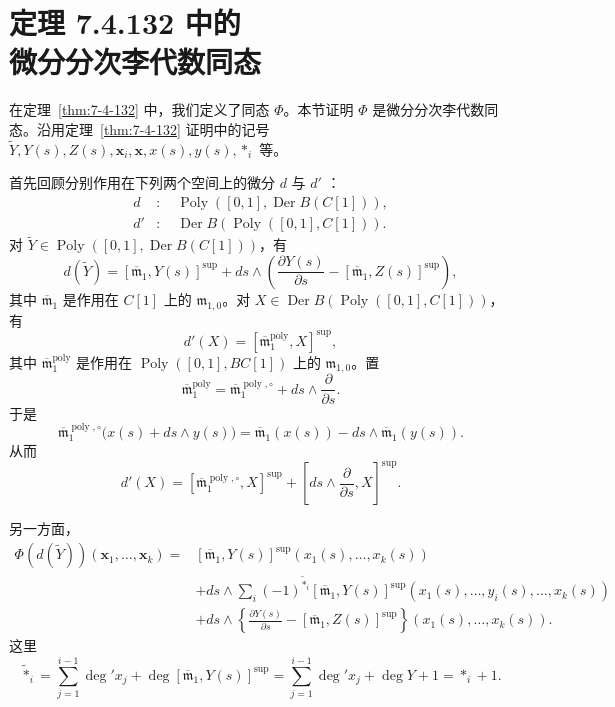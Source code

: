 
\chapter[定理 7.4.132 中的微分分次李代数同态]
{定理 7.4.132 中的\\\mbox{微分分次李代数同态}}
\label{app:a4}

在定理~\ref{thm:7-4-132} 中，我们定义了同态 $\Phi$。本节证明
$\Phi$ 是微分分次李代数同态。沿用定理~\ref{thm:7-4-132}
证明中的记号
$\widetilde Y,Y(s),Z(s),\mathbf x_i,\mathbf x,x(s),y(s),*_i$ 等。

首先回顾分别作用在下列两个空间上的微分 $d$ 与 $d'$%
：
\[
\begin{aligned}
 d&:\quad
 \operatorname{Poly}([0,1],\operatorname{Der}B(C[1])),\\
 d'&:\quad
 \operatorname{Der}B(\operatorname{Poly}([0,1],C[1])).
\end{aligned}
\]
对
$\widetilde Y\in
\operatorname{Poly}([0,1],\operatorname{Der}B(C[1]))$，有
\[
 d(\widetilde Y)
 =[\overline{\mathfrak m}_1,Y(s)]^{\mathrm{sup}}
 +ds\wedge\left(
   \frac{\partial Y(s)}{\partial s}
   -[\overline{\mathfrak m}_1,Z(s)]^{\mathrm{sup}}
 \right),
\]
其中 $\overline{\mathfrak m}_1$ 是作用在 $C[1]$ 上的
$\mathfrak m_{1,0}$。对
$X\in\operatorname{Der}B(\operatorname{Poly}([0,1],C[1]))$，有
\[
 d'(X)=[\overline{\mathfrak m}_1^{\operatorname{poly}},X]^{\mathrm{sup}},
\]
其中 $\overline{\mathfrak m}_1^{\operatorname{poly}}$ 是作用在
$\operatorname{Poly}([0,1],BC[1])$ 上的 $\mathfrak m_{1,0}$。置
\[
 \overline{\mathfrak m}_1^{\operatorname{poly}}
 =\overline{\mathfrak m}_1^{\operatorname{poly},\circ}
  +ds\wedge\frac{\partial}{\partial s}.
\]
于是
\[
 \overline{\mathfrak m}_1^{\operatorname{poly},\circ}
 \bigl(x(s)+ds\wedge y(s)\bigr)
 =\overline{\mathfrak m}_1(x(s))
  -ds\wedge\overline{\mathfrak m}_1(y(s)).
\]
从而
\[
 d'(X)
 =[\overline{\mathfrak m}_1^{\operatorname{poly},\circ},X]^{\mathrm{sup}}
 +\left[ds\wedge\frac{\partial}{\partial s},X\right]^{\mathrm{sup}}.
\]

另一方面，
\begingroup\small
\begin{equation}
\begin{aligned}
 \Phi(d(\widetilde Y))(\mathbf x_1,\ldots,\mathbf x_k)
 ={}&[\overline{\mathfrak m}_1,Y(s)]^{\mathrm{sup}}
       (x_1(s),\ldots,x_k(s))\\
 &+ds\wedge\sum_i(-1)^{\widetilde{*}_i}
   [\overline{\mathfrak m}_1,Y(s)]^{\mathrm{sup}}
   (x_1(s),\ldots,y_i(s),\ldots,x_k(s))\\
 &+ds\wedge\left\{
   \frac{\partial Y(s)}{\partial s}
   -[\overline{\mathfrak m}_1,Z(s)]^{\mathrm{sup}}
   \right\}(x_1(s),\ldots,x_k(s)).
\end{aligned}
\tag{A4.1}\label{eq:a4-1}
\end{equation}
\endgroup
这里
\[
 \widetilde{*}_i
 =\sum_{j=1}^{i-1}\deg' x_j
  +\deg[\overline{\mathfrak m}_1,Y(s)]^{\mathrm{sup}}
 =\sum_{j=1}^{i-1}\deg' x_j+\deg Y+1
 =*_i+1.
\]

